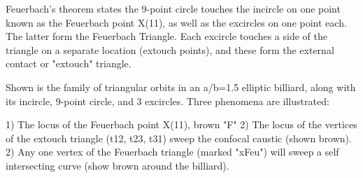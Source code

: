 Feuerbach's theorem states the 9-point circle touches the incircle on one point known as the Feuerbach point X(11), as well as the excircles on one point each. The latter form the Feuerbach Triangle. Each excircle touches a side of the triangle on a separate location (extouch points), and these form the external contact or "extouch" triangle.

Shown is the family of triangular orbits in an a/b=1.5 elliptic billiard, along with its incircle, 9-point circle, and 3 excircles. Three phenomena are illustrated:

1) The locus of the Feuerbach point X(11), brown "F"
2) The locus of the vertices of the extouch triangle (t12, t23, t31) sweep the confocal caustic (shown brown).
2) Any one vertex of the Feuerbach triangle (marked "xFeu") will sweep a self intersecting curve (show brown around the billiard).